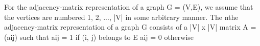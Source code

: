 \documentclass[preview]{standalone}
\begin{document}
\begin{center}
For the adjacency-matrix representation of a graph G = (V,E), we assume
that the vertices are numbered 1, 2, ..., |V| in some arbitrary manner. The nthe adjacency-matrix representation of a graph G consists of a |V| x |V| matrix
A = (aij) such that
aij = 1 if (i, j) belongs to E
aij = 0 otherwise
\end{center}
\end{document}
